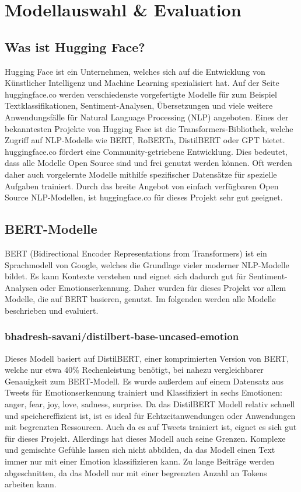 \section{Modellauswahl \& Evaluation}

\subsection{Was ist Hugging Face?}
Hugging Face ist ein Unternehmen, welches sich auf die Entwicklung von Künstlicher Intelligenz und Machine Learning spezialisiert hat. Auf der Seite huggingface.co werden verschiedenste vorgefertigte Modelle für zum Beispiel Textklassifikationen, Sentiment-Analysen, Übersetzungen und viele weitere Anwendungsfälle für Natural Language Processing (NLP) angeboten. Eines der bekanntesten Projekte von Hugging Face ist die \newline
Transformers-Bibliothek, welche Zugriff auf NLP-Modelle wie BERT, RoBERTa, DistilBERT oder GPT bietet. huggingface.co fördert eine Community-getriebene Entwicklung. Dies bedeutet, dass alle Modelle Open Source sind und frei genutzt werden können. Oft werden daher auch vorgelernte Modelle mithilfe spezifischer Datensätze für spezielle Aufgaben trainiert. Durch das breite Angebot von einfach verfügbaren Open Source NLP-Modellen, ist huggingface.co für dieses Projekt sehr gut geeignet.

\subsection{BERT-Modelle}
BERT (Bidirectional Encoder Representations from Transformers) ist ein Sprachmodell von Google, welches die Grundlage vieler moderner NLP-Modelle bildet. Es kann Kontexte verstehen und eignet sich dadurch gut für Sentiment-Analysen oder Emotionserkennung. Daher wurden für dieses Projekt vor allem Modelle, die auf BERT basieren, genutzt. Im folgenden werden alle Modelle beschrieben und evaluiert.

\subsubsection{bhadresh-savani/distilbert-base-uncased-emotion}
Dieses Modell basiert auf DistilBERT, einer komprimierten Version von BERT, welche nur etwa 40\% Rechenleistung benötigt, bei nahezu vergleichbarer Genauigkeit zum BERT-Modell. Es wurde außerdem auf einem Datensatz aus Tweets für Emotionserkennung trainiert und Klassifiziert in sechs Emotionen: anger, fear, joy, love, sadness, surprise. Da das DistilBERT Modell relativ schnell und speichereffizient ist, ist es ideal für Echtzeitanwendungen oder Anwendungen mit begrenzten Ressourcen. Auch da es auf Tweets trainiert ist, eignet es sich gut für dieses Projekt. Allerdings hat dieses Modell auch seine Grenzen. Komplexe und gemischte Gefühle lassen sich nicht abbilden, da das Modell einen Text immer nur mit einer Emotion klassifizieren kann. Zu lange Beiträge werden abgeschnitten, da das Modell nur mit einer begrenzten Anzahl an Tokens arbeiten kann.

